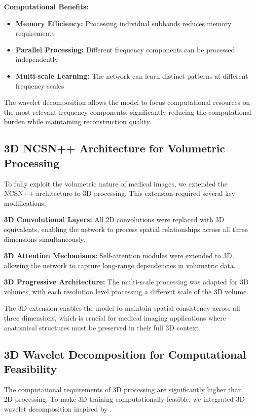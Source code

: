 \documentclass{midl} %
\begin{document}
\textbf{Computational Benefits:}
\begin{itemize}
\item \textbf{Memory Efficiency:} Processing individual subbands reduces memory requirements
\item \textbf{Parallel Processing:} Different frequency components can be processed independently
\item \textbf{Multi-scale Learning:} The network can learn distinct patterns at different frequency scales
\end{itemize}

The wavelet decomposition allows the model to focus computational resources on the most relevant frequency components, significantly reducing the computational burden while maintaining reconstruction quality.

\subsection{3D NCSN++ Architecture for Volumetric Processing}

To fully exploit the volumetric nature of medical images, we extended the NCSN++ architecture to 3D processing. This extension required several key modifications:

\textbf{3D Convolutional Layers:} All 2D convolutions were replaced with 3D equivalents, enabling the network to process spatial relationships across all three dimensions simultaneously.

\textbf{3D Attention Mechanisms:} Self-attention modules were extended to 3D, allowing the network to capture long-range dependencies in volumetric data.

\textbf{3D Progressive Architecture:} The multi-scale processing was adapted for 3D volumes, with each resolution level processing a different scale of the 3D volume.

The 3D extension enables the model to maintain spatial consistency across all three dimensions, which is crucial for medical imaging applications where anatomical structures must be preserved in their full 3D context.

\subsection{3D Wavelet Decomposition for Computational Feasibility}

The computational requirements of 3D processing are significantly higher than 2D processing. To make 3D training computationally feasible, we integrated 3D wavelet decomposition inspired by \citet{friedrich2024wdm}.
\end{document}
